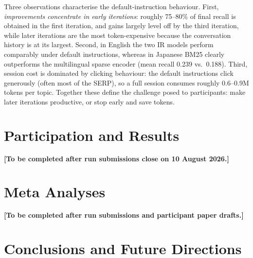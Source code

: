 \documentclass[sigconf,article]{acmart}
\begin{document}
Three observations characterise the default-instruction behaviour. First,
\emph{improvements concentrate in early iterations}: roughly 75--80\% of
final recall is obtained in the first iteration, and gains largely level off
by the third iteration, while later iterations are the most token-expensive
because the conversation history is at its largest. Second, in English the
two IR models perform comparably under default instructions, whereas in
Japanese BM25 clearly outperforms the multilingual sparse encoder (mean
recall 0.239 vs.\ 0.188). Third, session cost is dominated by clicking
behaviour: the default instructions click generously (often most of the
SERP), so a full session consumes roughly 0.6--0.9M tokens per topic.
Together these define the challenge posed to participants: make later
iterations productive, or stop early and save tokens.

\section{Participation and Results}
\label{sec:results}


\textbf{[To be completed after run submissions close on 10 August 2026.]}

\section{Meta Analyses}
\label{sec:meta}


\textbf{[To be completed after run submissions and participant paper
drafts.]}

\section{Conclusions and Future Directions}
\label{sec:conclusions}
\end{document}
